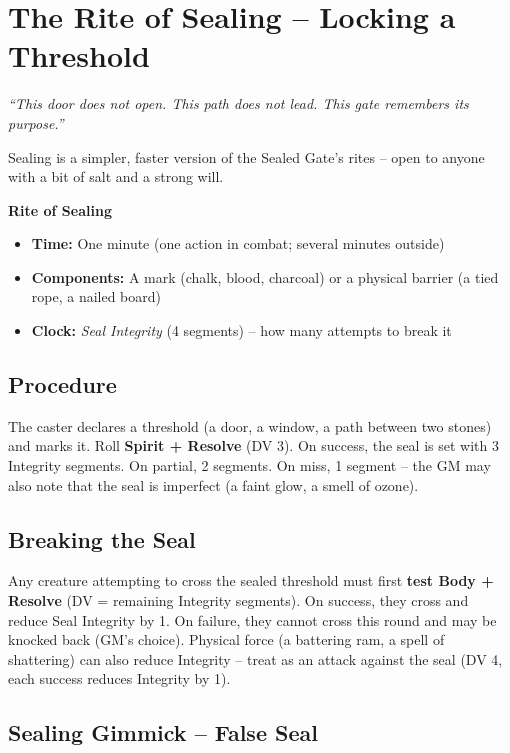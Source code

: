\documentclass[10pt,a5paper]{book}
\begin{document}
\section{The Rite of Sealing – Locking a Threshold}

\textit{“This door does not open. This path does not lead. This gate remembers its purpose.”}

Sealing is a simpler, faster version of the Sealed Gate’s rites – open to anyone with a bit of salt and a strong will.

\begin{tcolorbox}[colback=blue!5, colframe=blue!70]
\textbf{Rite of Sealing}
\begin{itemize}
    \item \textbf{Time:} One minute (one action in combat; several minutes outside)
    \item \textbf{Components:} A mark (chalk, blood, charcoal) or a physical barrier (a tied rope, a nailed board)
    \item \textbf{Clock:} \textit{Seal Integrity} (4 segments) – how many attempts to break it
\end{itemize}
\end{tcolorbox}

\subsection*{Procedure}

The caster declares a threshold (a door, a window, a path between two stones) and marks it. Roll \textbf{Spirit + Resolve} (DV 3). On success, the seal is set with 3 Integrity segments. On partial, 2 segments. On miss, 1 segment – the GM may also note that the seal is imperfect (a faint glow, a smell of ozone).

\subsection*{Breaking the Seal}

Any creature attempting to cross the sealed threshold must first \textbf{test Body + Resolve} (DV = remaining Integrity segments). On success, they cross and reduce Seal Integrity by 1. On failure, they cannot cross this round and may be knocked back (GM’s choice). Physical force (a battering ram, a spell of shattering) can also reduce Integrity – treat as an attack against the seal (DV 4, each success reduces Integrity by 1).

\subsection*{Sealing Gimmick – False Seal}
\end{document}
